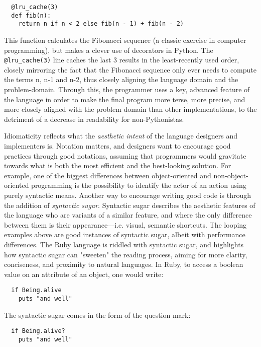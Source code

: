 \begin{lstlisting}
  @lru_cache(3)
  def fib(n):
    return n if n < 2 else fib(n - 1) + fib(n - 2)
\end{lstlisting}

This function calculates the Fibonacci sequence (a classic exercise in computer programming), but makes a clever use of decorators in Python. The \lstinline{@lru_cache(3)} line caches the last 3 results in the least-recently used order, closely mirroring the fact that the Fibonacci sequence only ever needs to compute the terms n, n-1 and n-2, thus closely aligning the language domain and the problem-domain. Through this, the programmer uses a key, advanced feature of the language in order to make the final program more terse, more precise, and more closely aligned with the problem domain than other implementations, to the detriment of a decrease in readability for non-Pythonistas.

Idiomaticity reflects what the \emph{aesthetic intent} of the language designers and implementers is. Notation matters, and designers want to encourage good practices through good notations, assuming that programmers would gravitate towards what is both the most efficient and the best-looking solution. For example, one of the biggest differences between object-oriented and non-object-oriented programming is the possibility to identify the actor of an action using purely syntactic means\citep{sustrik_250bpm_2021}. Another way to encourage writing good code is through the addition of \emph{syntactic sugar}. Syntactic sugar describes the aesthetic features of the language who are variants of a similar feature, and where the only difference between them is their appearance—i.e. visual, semantic shortcuts. The looping examples above are good instances of syntactic sugar, albeit with performance differences. The Ruby language is riddled with syntactic sugar, and highlights how syntactic sugar can "sweeten" the reading process, aiming for more clarity, conciseness, and proximity to natural languages. In Ruby, to access a boolean value on an attribute of an object, one would write:

\begin{lstlisting}
  if Being.alive
    puts "and well"
\end{lstlisting}

The syntactic sugar comes in the form of the question mark:

\begin{lstlisting}
  if Being.alive?
    puts "and well"
\end{lstlisting}

